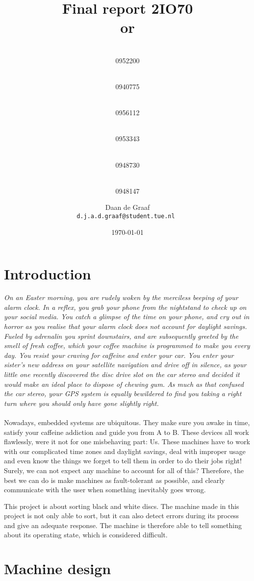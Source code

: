 \documentclass[a4paper,oneside,11pt]{report}
\title{\vspace{-\baselineskip}\sffamily\bfseries \Huge{ Final report 2IO70}
\small \\or \naam
}
\author{
	\makebox[.25\linewidth]{Sergio van Amerongen}\\0952200 \and
	\makebox[.25\linewidth]{Stefan Cloudt}\\0940775 \and
	\makebox[.25\linewidth]{Daan de Graaf}\\0956112 \and
	\makebox[.25\linewidth]{Robert van Lente}\\0953343 \and
	\makebox[.25\linewidth]{Tom Peters}\\0948730 \and
	\makebox[.25\linewidth]{Berrie Trippe}\\0948147 
	\and \makebox[.75\linewidth]{\textbf{Responsible:}} \and
	Daan de Graaf\\ \tt{d.j.a.d.graaf@student.tue.nl}
}
\date{\today}
\begin{document}
\maketitle

\tableofcontents

\chapter{Introduction}
\textit{
On an Easter morning, you are rudely woken by the merciless beeping of your alarm clock. In a reflex, you grab your phone from the nightstand to check up on your social media. You catch a glimpse of the time on your phone, and cry out in horror as you realise that your alarm clock does not account for daylight savings. Fueled by adrenalin you sprint downstairs, and are subsequently greeted by the smell of fresh coffee, which your coffee machine is programmed to make you every day. You resist your craving for caffeine and enter your car. You enter your sister's new address on your satellite navigation and drive off in silence, as your little one recently discovered the disc drive slot on the car stereo and decided it would make an ideal place to dispose of chewing gum. As much as that confused the car stereo, your GPS system is equally bewildered to find you taking a right turn where you should only have gone slightly right.
}
\\\\
Nowadays, embedded systems are ubiquitous. They make sure you awake in time, satisfy your caffeine addiction and guide you from A to B. These devices all work flawlessly, were it not for one misbehaving part: Us. These machines have to work with our complicated time zones and daylight savings, deal with improper usage and even know the things we forget to tell them in order to do their jobs right! Surely, we can not expect any machine to account for all of this? Therefore, the best we can do is make machines as fault-tolerant as possible, and clearly communicate with the user when something inevitably goes wrong.

This project is about sorting black and white discs. The machine made in this project is not only able to sort, but it can also detect errors during its process and give an adequate response. The machine is therefore able to tell something about its operating state, which is considered difficult.


\chapter{Machine design}

\end{document}
